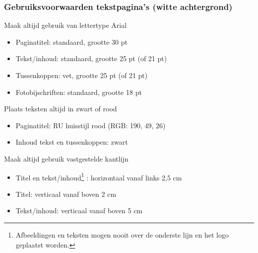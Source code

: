 \documentclass[department=none, notes={show notes}, slidesperpage=4, official=true, handout]{beamerruhuisstijl}
\begin{document}
\begin{frame}
    \frametitle{Gebruiksvoorwaarden tekstpagina's (witte achtergrond)}

    \begin{block}{Maak altijd gebruik van lettertype Arial}
        \begin{itemize}
            \item Paginatitel: standaard, grootte 30 pt
            \item Tekst/inhoud: standaard, grootte 25 pt (of 21 pt)
            \item Tussenkoppen: vet, grootte 25 pt (of 21 pt)
            \item Fotobijschriften: standaard, grootte 18 pt
        \end{itemize}
    \end{block}

    \begin{block}{Plaats teksten altijd in zwart of rood}
        \begin{itemize}
            \item Paginatitel: RU huisstijl rood {\color{ruhuisstijlrood} (RGB: 190, 49, 26)}
            \item Inhoud tekst en tussenkoppen: zwart
        \end{itemize}
    \end{block}

    \begin{block}{Maak altijd gebruik vastgestelde kantlijn}
        \begin{itemize}
            \item Titel en tekst/inhoud\footnote{Afbeeldingen en teksten mogen nooit over de onderste lijn en het logo geplaatst worden.}
: horizontaal vanaf links 2,5 cm
            \item Titel: verticaal vanaf boven 2 cm
            \item Tekst/inhoud: verticaal vanaf boven 5 cm
        \end{itemize}
    \end{block}

\end{frame}
\end{document}
